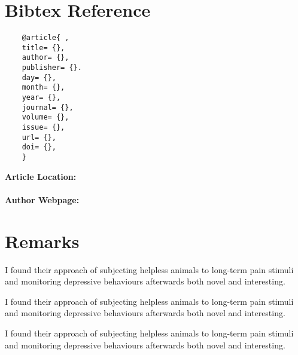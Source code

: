 \documentclass[10pt,letterpaper,twocolumn,landscape]{article}
\begin{document}
\section*{Bibtex Reference}
\begin{verbatim}
	@article{ ,
    title= {},
    author= {},
    publisher= {}.
    day= {},
    month= {},
    year= {},
    journal= {},
    volume= {},
    issue= {},
    url= {},
    doi= {},
    }
\end{verbatim}


\textbf{Article Location:} \\
\url{} \\


\textbf{Author Webpage:} \\
\url{}


\section{Remarks}

\begin{rem}
I found their approach of subjecting helpless animals to long-term pain stimuli and monitoring depressive behaviours afterwards both novel and interesting.
\end{rem}


\begin{rem}
I found their approach of subjecting helpless animals to long-term pain stimuli and monitoring depressive behaviours afterwards both novel and interesting.
\end{rem}


\begin{rem}
I found their approach of subjecting helpless animals to long-term pain stimuli and monitoring depressive behaviours afterwards both novel and interesting.
\end{rem}




\renewcommand{\refname}{Formatted Reference}
\nocite{*}




\listoftodos
\end{document}
